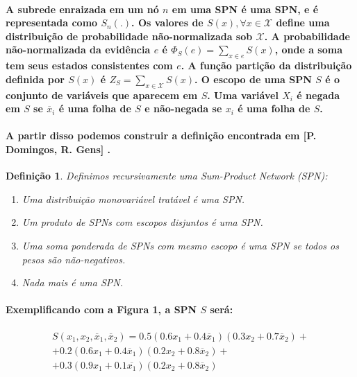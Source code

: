 \documentclass[a4paper,10pt]{article}
\theoremstyle{plain}
\newtheorem{spn-def}{Definição}
\begin{document}
\paragraph{
  A subrede enraizada em um nó $n$ em uma SPN é uma SPN, e é representada como $S_n(.)$. Os valores
  de $S(x), \forall x \in \mathcal{X}$ define uma distribuição de probabilidade não-normalizada sob
  $\mathcal{X}$. A probabilidade não-normalizada da evidência $e$ é $\Phi_S(e)=\sum_{x \in e}S(x)$,
  onde a soma tem seus estados consistentes\cite{report-1} com $e$. A função partição da
  distribuição definida por $S(x)$ é $Z_S = \sum_{x \in \mathcal{X}} S(x)$. O escopo
  \cite{project-def} de uma SPN $S$ é o conjunto de variáveis que aparecem em $S$. Uma variável
  $X_i$ é negada em $S$ se $\overline{x}_i$ é uma folha de $S$ e não-negada se $x_i$ é uma folha de
  $S$.
}

\paragraph{
  A partir disso podemos construir a definição encontrada em [P. Domingos, R. Gens]
  \cite{gens-domingos}.
}

\begin{spn-def} Definimos recursivamente uma Sum-Product Network (SPN):
  \begin{enumerate}
    \item Uma distribuição monovariável tratável é uma SPN.
    \item Um produto de SPNs com escopos disjuntos é uma SPN.
    \item Uma soma ponderada de SPNs com mesmo escopo é uma SPN se todos os pesos são não-negativos.
    \item Nada mais é uma SPN.
  \end{enumerate}
\end{spn-def}

\paragraph{
  Exemplificando com a Figura 1, a SPN $S$ será:
}

\begin{equation}
  \begin{split}
    S(x_1,x_2,\overline{x}_1,\overline{x}_2)=0.5(0.6x_1 + 0.4\overline{x}_1)(0.3x_2 + 0.7
    \overline{x}_2) +\\
    + 0.2(0.6x_1 + 0.4\overline{x}_1)(0.2x_2 + 0.8\overline{x}_2) +\\
    + 0.3(0.9x_1 + 0.1\overline{x_1})(0.2x_2 + 0.8\overline{x}_2)\phantom{+}
  \end{split}
\end{equation}
\end{document}
